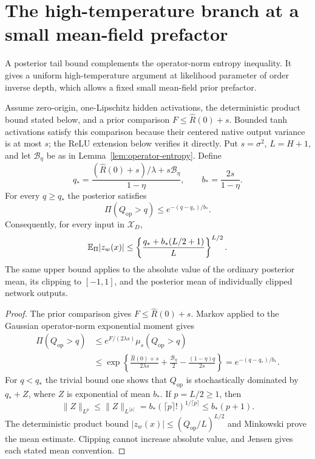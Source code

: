 \section{The high-temperature branch at a small mean-field prefactor}
\label{sec:operator-energy-tail}
A posterior tail bound complements the operator-norm entropy inequality. It gives a uniform high-temperature argument at likelihood parameter of order inverse depth, which allows a fixed small mean-field prior prefactor.

\begin{lemma}
\label{lem:posterior-op-tail}
Assume zero-origin, one-Lipschitz hidden activations, the deterministic product bound stated below, and a prior comparison $F\le\widehat R(0)+s$. Bounded tanh activations satisfy this comparison because their centered native output variance is at most $s$; the ReLU extension below verifies it directly. Put $s=\sigma^2$, $L=H+1$, and let $\mathcal B_\eta$ be as in Lemma~\ref{lem:operator-entropy}. Define
\[
 q_* =\frac{(\widehat R(0)+s)/\lambda+s\mathcal B_\eta}{1-\eta},
 \qquad b_* =\frac{2s}{1-\eta}.
\]
For every $q\ge q_*$ the posterior satisfies
\[
 \Pi(Q_{\mathrm{op}}>q)\le e^{-(q-q_*)/b_*}.
\]
Consequently, for every input in $\mathcal X_D$,
\[
 \mathbb E_\Pi |z_w(x)|
 \le\left\{\frac{q_*+b_*(L/2+1)}L\right\}^{L/2}.
\]
The same upper bound applies to the absolute value of the ordinary posterior mean, its clipping to $[-1,1]$, and the posterior mean of individually clipped network outputs.
\end{lemma}
\begin{proof}
The prior comparison gives $F\le\widehat R(0)+s$. Markov applied to the Gaussian operator-norm exponential moment gives
\begin{align*}
 \Pi(Q_{\mathrm{op}}>q)
 &\le e^{F/(2\lambda s)}\mu_s(Q_{\mathrm{op}}>q)\\
 &\le\exp\left\{\frac{\widehat R(0)+s}{2\lambda s}
       +\frac{\mathcal B_\eta}2-\frac{(1-\eta)q}{2s}\right\}
 =e^{-(q-q_*)/b_*}.
\end{align*}
For $q<q_*$ the trivial bound one shows that $Q_{\mathrm{op}}$ is stochastically dominated by $q_*+Z$, where $Z$ is exponential of mean $b_*$. If $p=L/2\ge1$, then
\[
 \|Z\|_{L^p}\le\|Z\|_{L^{\lceil p\rceil}}
 =b_*(\lceil p\rceil!)^{1/\lceil p\rceil}
 \le b_*(p+1).
\]
The deterministic product bound $|z_w(x)|\le(Q_{\mathrm{op}}/L)^{L/2}$ and Minkowski prove the mean estimate. Clipping cannot increase absolute value, and Jensen gives each stated mean convention.
\end{proof}


